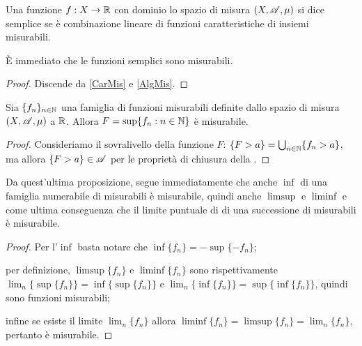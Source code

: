 \begin{definition}
	Una funzione $f:X \rightarrow \mathbb R$ con dominio lo spazio di misura $(X,\mathscr A,\mu)$ si dice semplice se è combinazione lineare di
	funzioni caratteristiche di insiemi misurabili.
\end{definition}
\begin{remark}
	È immediato che le funzioni semplici sono misurabili.
\end{remark}
\begin{proof}
	Discende da \cref{CarMis} e \cref{AlgMis}.
\end{proof}


\begin{proposition}
	Sia $\{f_n\}_{n\in \mathbb N}$ una famiglia di funzioni misurabili definite dallo spazio di misura $(X,\mathscr A,\mu)$ a $\mathbb R$.
	Allora $F=\sup\{f_n:n\in \mathbb N\}$ è misurabile.
\end{proposition}
\begin{proof}
	Consideriamo il sovralivello della funzione $F$: $\{F>a\}=\bigcup_{n\in \mathbb N}\{f_n>a\}$, ma allora $\{F>a\}\in \mathscr A$ per le proprietà 
	di chiusura della \sigalg.
\end{proof}

\begin{remark}
	\label{LimMis}
	Da quest'ultima proposizione, segue immediatamente che anche $\inf$ di una famiglia numerabile di misurabili è misurabile,
	quindi anche $\limsup$ e $\liminf$ e come ultima conseguenza che il limite puntuale di di una successione di misurabili è misurabile.
\end{remark}
\begin{proof}
	Per l'$\inf$ basta notare che $\inf\{f_n\}=-\sup\{-f_n\}$;
	
	per definizione, $\limsup\{f_n\}$ e $\liminf\{f_n\}$ sono rispettivamente $\lim_n\{\sup\{f_n\}\}=\inf\{\sup\{f_n\}\}$ e
	$\lim_n\{\inf\{f_n\}\}=\sup\{\inf\{f_n\}\}$, quindi sono funzioni misurabili;
	
	infine se esiste il limite $\lim_n\{f_n\}$ allora $\liminf\{f_n\}=\limsup\{f_n\}=\lim_n\{f_n\}$, pertanto è misurabile.
\end{proof}

